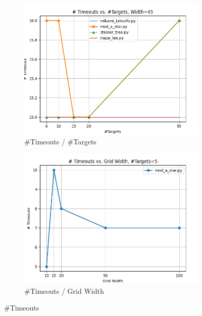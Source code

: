 \begin{figure}
\centering

\begin{subfigure}[b]{\linewidth}
    \includegraphics[width=\linewidth]{figures/plots/timeouts_areaConst.png}
    \caption{\#Timeouts / \#Targets}
\end{subfigure}
\begin{subfigure}[b]{\linewidth}
    \includegraphics[width=\linewidth]{figures/plots/timeouts_nConst.png}
    \caption{\#Timeouts / Grid Width}
\end{subfigure}

\caption{\#Timeouts}
\label{fig:timeouts}
\end{figure}
    